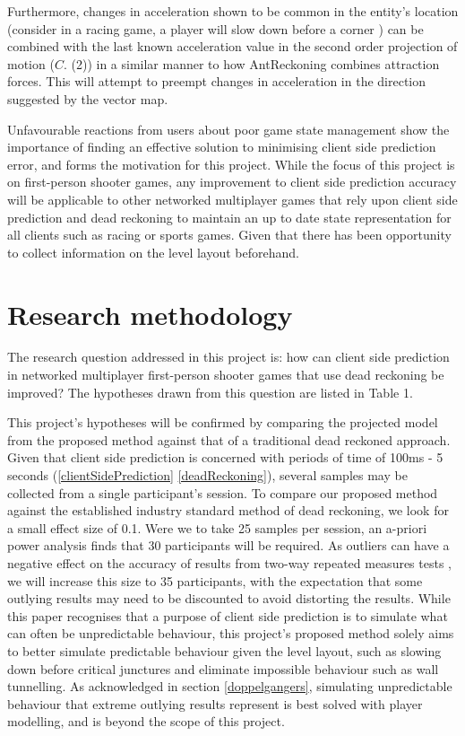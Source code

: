 \documentclass[journal]{IEEEtran}
\begin{document}
Furthermore, changes in acceleration shown to be common in the entity's location (consider in a racing game, a player will slow down before a corner \cite{larsson2016movement}) can be combined with the last known acceleration value in the second order projection of motion ($C.$ (2)) in a similar manner to how AntReckoning combines attraction forces. This will attempt to preempt changes in acceleration in the direction suggested by the vector map.

Unfavourable reactions from users about poor game state management show the importance of finding an effective solution to minimising client side prediction error, and forms the motivation for this project. While the focus of this project is on first-person shooter games, any improvement to client side prediction accuracy will be applicable to other networked multiplayer games that rely upon client side prediction and dead reckoning to maintain an up to date state representation for all clients such as racing or sports games. Given that there has been opportunity to collect information on the level layout beforehand.

\section{Research methodology}

The research question addressed in this project is: how can client side prediction in networked multiplayer first-person shooter games that use dead reckoning be improved? The hypotheses drawn from this question are listed in Table 1.

This project's hypotheses will be confirmed by comparing the projected model from the proposed method against that of a traditional dead reckoned approach. Given that client side prediction is concerned with periods of time of 100ms - 5 seconds (\ref{clientSidePrediction} \ref{deadReckoning}), several samples may be collected from a single participant's session. To compare our proposed method against the established industry standard method of dead reckoning, we look for a small effect size of 0.1. Were we to take 25 samples per session, an a-priori power analysis finds that 30 participants will be required. As outliers can have a negative effect on the accuracy of results from two-way repeated measures tests \cite{anova2018laerd}, we will increase this size to 35 participants, with the expectation that some outlying results may need to be discounted to avoid distorting the results. While this paper recognises that a purpose of client side prediction is to simulate what can often be unpredictable behaviour, this project's proposed method solely aims to better simulate predictable behaviour given the level layout, such as slowing down before critical junctures and eliminate impossible behaviour such as wall tunnelling. As acknowledged in section \ref{doppelgangers}, simulating unpredictable behaviour that extreme outlying results represent is best solved with player modelling, and is beyond the scope of this project.
\end{document}
